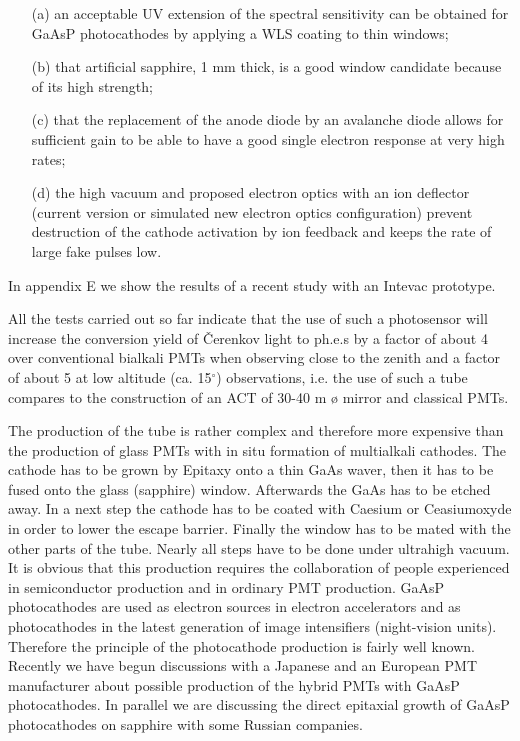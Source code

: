 \begin{itemize}
\item[(a)]  an acceptable UV extension of the spectral sensitivity can be
obtained for GaAsP photocathodes by applying a WLS coating to thin windows;

\item[(b)]  that artificial sapphire, 1 mm thick, is a good window candidate
because of its high strength;

\item[(c)]  that the replacement of the anode diode by an 
avalanche diode allows for
sufficient gain to be able to have a good single electron response at very
high rates;

\item[(d)]  the high vacuum and proposed electron optics with an ion
deflector (current version or simulated new electron optics configuration)
prevent destruction of the cathode activation by ion feedback and keeps the
rate of large fake pulses low.
\end{itemize}

In appendix E we show the results of a recent study with an Intevac prototype.

All the tests carried out so far indicate that the use of such a
photosensor will increase the conversion yield of \v{C}erenkov light to ph.e.s by a
factor of about 4 over conventional bialkali PMTs when observing close to the
zenith and a factor of about 5 at low altitude (ca. 15$^\circ$)
observations, i.e. the use of such a tube compares to the construction of an
ACT of 30-40 m {\o} mirror and classical PMTs.

The production of the tube is rather complex and therefore more expensive
than the production of glass PMTs with in situ formation of multialkali
cathodes. The cathode has to be grown by Epitaxy onto a thin GaAs waver,
then it has to be fused onto the glass (sapphire) window. Afterwards the
GaAs has to be etched away. In a next step the cathode has to be coated with
Caesium or Ceasiumoxyde in order to lower the escape barrier. Finally the
window has to be mated with the other parts of the tube. Nearly all steps
have to be done under ultrahigh vacuum. It is obvious that this production
requires the collaboration of people experienced in semiconductor production
and in ordinary PMT production. GaAsP photocathodes are used as
electron sources in electron accelerators and as photocathodes in the latest
generation of image intensifiers (night-vision units). Therefore the
principle of the photocathode production is fairly well known. Recently we
have begun discussions with a Japanese and an European PMT manufacturer about
possible production of the hybrid PMTs with GaAsP photocathodes. In parallel
we are discussing the direct epitaxial growth of GaAsP photocathodes on
sapphire with some Russian companies.

